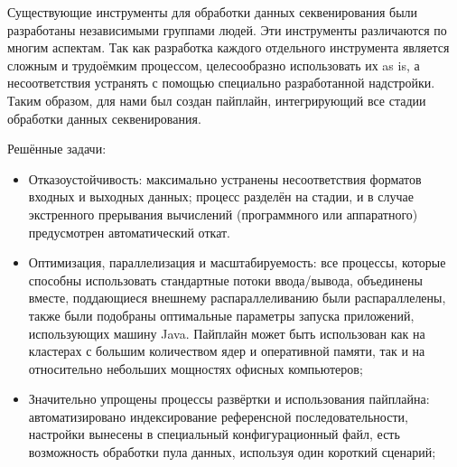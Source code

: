 \documentclass[a4paper,12pt]{article}
\begin{document}
Существующие инструменты для обработки данных секвенирования были разработаны независимыми группами людей.
Эти инструменты различаются по многим аспектам.
% 
%
Так как разработка каждого отдельного инструмента является сложным и трудоёмким процессом, целесообразно использовать их as is, а несоответствия устранять с помощью специально разработанной надстройки.
Таким образом, для нами был создан пайплайн, интегрирующий все стадии обработки данных секвенирования.

Решённые задачи:

\begin{itemize}
\item Отказоустойчивость: максимально устранены несоответствия форматов входных и выходных данных; процесс разделён на стадии, и в случае экстренного прерывания вычислений (программного или аппаратного) предусмотрен автоматический откат.
\item Оптимизация, параллелизация и масштабируемость: все процессы, которые способны использовать стандартные потоки ввода/вывода, объединены вместе, поддающиеся внешнему распараллеливанию были распараллелены, также были подобраны оптимальные параметры запуска приложений, использующих машину Java.
Пайплайн может быть использован как на кластерах с большим количеством ядер и оперативной памяти, так и на относительно небольших мощностях офисных компьютеров;
\item Значительно упрощены процессы развёртки и использования пайплайна: автоматизировано индексирование референсной последовательности, настройки вынесены в специальный конфигурационный файл, есть возможность обработки пула данных, используя один короткий сценарий;
\end{itemize}
\end{document}
